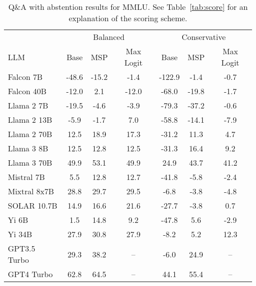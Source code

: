 \begin{table*}[h]
\centering
\caption{Q\&A with abstention results for MMLU. See Table~\ref{tab:score} for an explanation of the scoring scheme.}
\label{tab:mmlu_score}
\begin{tabular}{lcccccc}
\toprule
& \multicolumn{3}{c}{Balanced} & \multicolumn{3}{c}{Conservative} \\ 
LLM & Base & MSP & Max Logit & Base & MSP & Max Logit \\ 
\cmidrule(lr){1-1}\cmidrule(lr){2-4}\cmidrule(lr){5-7} 
Falcon 7B & -48.6 & -15.2 & -1.4 & -122.9 & -1.4 & -0.7\\
Falcon 40B & -12.0 & 2.1 & -12.0 & -68.0 & -19.8 & -1.7\\
Llama 2 7B & -19.5 & -4.6 & -3.9 & -79.3 & -37.2 & -0.6\\
Llama 2 13B & -5.9 & -1.7 & 7.0 & -58.8 & -14.1 & -7.9\\
Llama 2 70B & 12.5 & 18.9 & 17.3 & -31.2 & 11.3 & 4.7\\
Llama 3 8B & 12.5 & 12.8 & 12.5 & -31.3 & 16.4 & 9.2\\
Llama 3 70B & 49.9 & 53.1 & 49.9 & 24.9 & 43.7 & 41.2\\
Mistral 7B & 5.5 & 12.8 & 12.7 & -41.8 & -5.8 & -2.4\\
Mixtral 8x7B & 28.8 & 29.7 & 29.5 & -6.8 & -3.8 & -4.8\\
SOLAR 10.7B & 14.9 & 16.6 & 21.6 & -27.7 & -3.8 & 0.7\\
Yi 6B & 1.5 & 14.8 & 9.2 & -47.8 & 5.6 & -2.9\\
Yi 34B & 27.9 & 30.8 & 27.9 & -8.2 & 5.2 & 12.3\\
GPT3.5 Turbo & 29.3 & 38.2 & -- & -6.0 & 24.9 & --\\
GPT4 Turbo & 62.8 & 64.5 & -- & 44.1 & 55.4 & --\\
\bottomrule
\end{tabular}
\end{table*}
